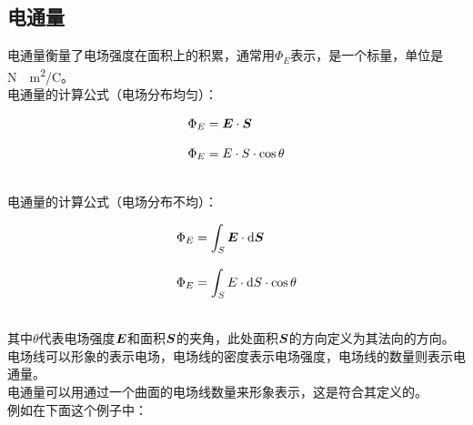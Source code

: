 \documentclass[UTF8]{ctexart}
\newcommand*{\veb}[1]{\vb*{#1}}
\newcommand*{\dif}{\mathop{}\!\mathrm{d}}
\begin{document}
\newpage

\subsection{电通量}
    电通量衡量了电场强度在面积上的积累，通常用$\Phi_E$表示，是一个标量，单位是\si{N\cdot m^2/C}。\\[3mm]
    电通量的计算公式（电场分布均匀）：
    \begin{large}
        \begin{align*}
            &\Phi_E=\veb{E}\cdot\veb{S}\\[3mm]
            &\Phi_E=E\cdot S\cdot\cos{\theta}
        \end{align*}
    \end{large}\\
    电通量的计算公式（电场分布不均）：
    \begin{large}
        \begin{align*}
            &\Phi_E=\int_S \veb{E}\cdot\dif \veb{S}\\[3mm]
            &\Phi_E=\int_S E\cdot\dif S\cdot\cos{\theta}
        \end{align*}
    \end{large}\\
    其中$\theta$代表电场强度$\veb{E}$和面积$\veb{S}$的夹角，此处面积$\veb{S}$的方向定义为其法向的方向。\\[10mm]
    电场线可以形象的表示电场，电场线的密度表示电场强度，电场线的数量则表示电通量。\\[3mm]
    电通量可以用通过一个曲面的电场线数量来形象表示，这是符合其定义的。\\[3mm]
    例如在下面这个例子中：\vspace{5pt}
\end{document}
